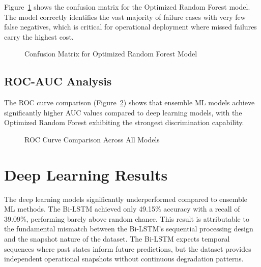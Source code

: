 \documentclass[12pt,letterpaper]{report}
\begin{document}
Figure~\ref{fig:cm_rf} shows the confusion matrix for the Optimized Random Forest model. The model correctly identifies the vast majority of failure cases with very few false negatives, which is critical for operational deployment where missed failures carry the highest cost.

\begin{figure}[H]
\centering
{}
\caption{Confusion Matrix for Optimized Random Forest Model}
\label{fig:cm_rf}
\end{figure}

\subsection{ROC-AUC Analysis}

The ROC curve comparison (Figure~\ref{fig:roc}) shows that ensemble ML models achieve significantly higher AUC values compared to deep learning models, with the Optimized Random Forest exhibiting the strongest discrimination capability.

\begin{figure}[H]
\centering
{}
\caption{ROC Curve Comparison Across All Models}
\label{fig:roc}
\end{figure}

\section{Deep Learning Results}

The deep learning models significantly underperformed compared to ensemble ML methods. The Bi-LSTM achieved only 49.15\% accuracy with a recall of 39.09\%, performing barely above random chance. This result is attributable to the fundamental mismatch between the Bi-LSTM's sequential processing design and the snapshot nature of the dataset. The Bi-LSTM expects temporal sequences where past states inform future predictions, but the dataset provides independent operational snapshots without continuous degradation patterns.
\end{document}
